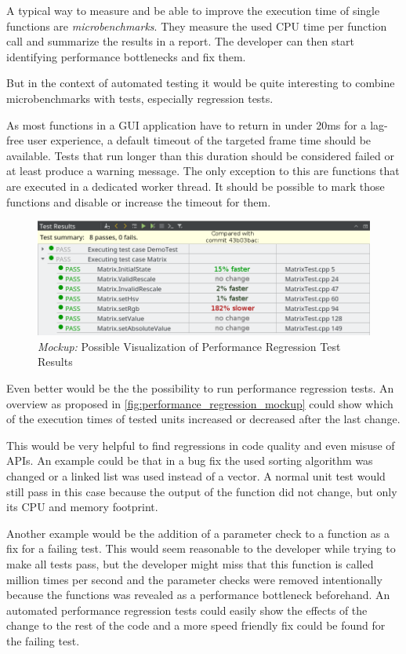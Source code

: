 \documentclass{scrreprt}
\begin{document}
A typical way to measure and be able to improve the execution time of single functions are \textit{microbenchmarks}. They measure the used CPU time per function call and summarize the results in a report. The developer can then start identifying performance bottlenecks and fix them.

But in the context of automated testing it would be quite interesting to combine microbenchmarks with tests, especially regression tests.

As most functions in a GUI application have to return in under 20ms for a lag-free user experience, a default timeout of the targeted frame time should be available. Tests that run longer than this duration should be considered failed or at least produce a warning message. The only exception to this are functions that are executed in a dedicated worker thread. It should be possible to mark those functions and disable or increase the timeout for them.

\begin{figure}[h]
	\centering
	\includegraphics[width=1.0\textwidth]{img/performance_regression_mockup}
	\caption[Mockup: Performance Regression]{\textit{Mockup:} Possible Visualization of Performance Regression Test Results}
	\label{fig:performance_regression_mockup}
\end{figure}

Even better would be the the possibility to run performance regression tests. An overview as proposed in \vref{fig:performance_regression_mockup} could show which of the execution times of tested units increased or decreased after the last change.

This would be very helpful to find regressions in code quality and even misuse of APIs. An example could be that in a bug fix the used sorting algorithm was changed or a linked list was used instead of a vector. A normal unit test would still pass in this case because the output of the function did not change, but only its CPU and memory footprint.

Another example would be the addition of a parameter check to a function as a fix for a failing test. This would seem reasonable to the developer while trying to make all tests pass, but the developer might miss that this function is called million times per second and the parameter checks were removed intentionally because the functions was revealed as a performance bottleneck beforehand. An automated performance regression tests could easily show the effects of the change to the rest of the code and a more speed friendly fix could be found for the failing test.
\end{document}
